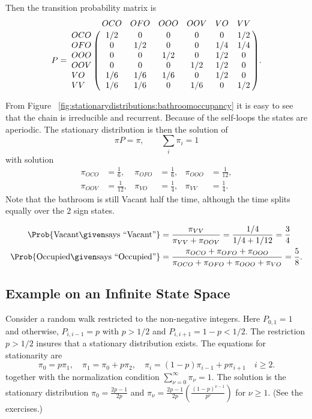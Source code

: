 \documentclass[12pt]{article}
\begin{document}
Then the transition probability matrix is
\[
    P= \bordermatrix{ & OCO & OFO & OOO & OOV & VO & VV \cr
    OCO & 1/2 & 0 & 0 & 0 & 0 & 1/2 \cr
    OFO & 0 & 1/2 & 0 & 0 & 1/4 & 1/4 \cr
    OOO & 0 & 0 & 1/2 & 0 & 1/2 & 0 \cr
    OOV & 0 & 0 & 0 & 1/2 & 1/2 & 0 \cr
    VO & 1/6 & 1/6 & 1/6 & 0 & 1/2 & 0 \cr
    VV & 1/6 & 1/6 & 0 & 1/6 & 0 & 1/2 \cr
    }.
\]

From Figure~%
\ref{fig:stationarydistributions:bathroomoccupancy} it is easy to see
that the chain is irreducible and recurrent.  Because of the self-loops
the states are aperiodic.  The stationary distribution is then the
solution of
\[
    \pi P = \pi, \qquad \sum\limits_{i} \pi_i = 1
\] with solution
\begin{align*}
    \pi_{OCO} &= \frac{1}{6}, & \pi_{OFO} &= \frac{1}{6}, & \pi_{OOO} &=
    \frac {1}{12}, \\
    \pi_{OOV} &= \frac{1}{12}, & \pi_{VO} &= \frac{1}{4}, & \pi_{VV} &=
    \frac{1}{4}.
\end{align*}
Note that the bathroom is still Vacant half the time, although the time
splits equally over the \( 2 \) sign states.

\begin{align*}
    \Prob{ \text{Vacant}\given \text{says ``Vacant''}} &= \frac{\pi_{VV}}
    {\pi_{VV}+\pi_{OOV}} = \frac{1/4}{1/4+1/12} = \frac{3}{4}\\
    \Prob{ \text{Occupied}\given \text{says ``Occupied''} } &= \frac{\pi_
    {OCO}+\pi_{OFO}+\pi_{OOO}} {\pi_{OCO}+\pi_{OFO}+\pi_{OOO}+\pi_{VO}}
    =\frac{5}{8}.
\end{align*}

\subsection*{Example on an Infinite State Space}

Consider a random walk restricted to the non-negative integers.  Here
\( P_{0,1} = 1 \) and otherwise, \( P_{i,i-1} = p \) with \( p > 1/2 \)
and \( P_{i,i+1} = 1- p < 1/2 \).  The restriction \( p > 1/2 \) 
insures that a stationary distribution exists.   The equations for
stationarity are
\[
  \pi_0 = p \pi_1, \quad \pi_1 = \pi_0 + p \pi_2, \quad \pi_i = (1-p)
  \pi_{i-1} + p \pi_{i+1} \quad i \ge 2.
\]
together with the normalization condition \( \sum_{\nu=0}^{\infty}
\pi_{\nu} = 1 \).
The solution is the stationary distribution \( \pi_0 = \frac{2p-1}{2p}
\) and \( \pi_{\nu} = \frac{2p-1}{2p} \left( \frac{(1-p)^{\nu -
      1}}{p^{\nu}} \right) \) for \( \nu \ge 1 \).  (See the exercises.)
\end{document}

